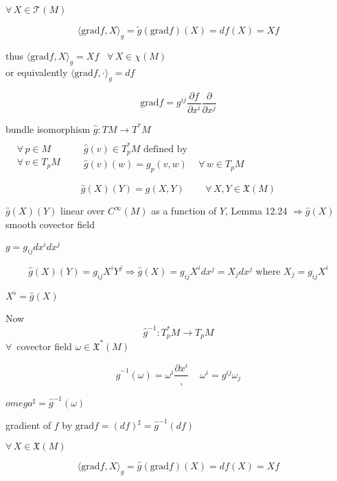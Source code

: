 $\forall \, X \in \mathcal{T}(M)$

\[
\langle \text{grad}{f}, X\rangle_g = \widetilde{g} (\text{grad}{f})(X) = df(X) = Xf
\]

thus $\langle \text{grad}{f}, X\rangle_g = Xf$ \quad \, $\forall \, X \in \mathcal{\chi}(M)$ \\
\phantom{thus } or equivalently $\langle \text{grad}{f}, \cdot \rangle_g = df$

\[
\text{grad}{f} = g^{ij} \frac{ \partial f}{ \partial x^i} \frac{ \partial }{ \partial x^j}
\]
\hrulefill


bundle isomorphism $\widehat{g} : TM \to T^*M$  \\

$\begin{aligned}
  & \quad \\ 
  & \forall \, p \in M \\
  & \forall \, v \in T_pM \end{aligned}$ \quad \quad \, $\begin{aligned} & \quad \\ 
  & \widehat{g}(v) \in T_p^*M \text{ defined by } \\
  & \widehat{g}(v)(w) = g_p(v,w) \quad \, \forall \, w \in T_p M \end{aligned}$

\[
\widehat{g}(X)(Y) = g(X,Y) \quad \quad \, \forall \, X,Y \in \mathfrak{X}(M)
\]


$\widehat{g}(X)(Y)$ linear over $C^{\infty}(M)$ as a function of $Y$, Lemma 12.24 $\Longrightarrow \widehat{g}(X)$ smooth covector field

$g=g_{ij}dx^i dx^j$ 

\[
\widehat{g}(X)(Y) = g_{ij}X^i Y^j \Longrightarrow \widehat{g}(X) = g_{ij}X^i dx^j = X_j dx^j \text{ where } X_j = g_{ij}X^i
\]

$X^{\flat} = \widehat{g}(X)$


Now
\[
\widehat{g}^{-1}:T_p^*M \to T_pM
\]
$\forall \, $ covector field $\omega \in \mathfrak{X}^*(M)$

\[
\widehat{g}^{-1}(\omega) = \omega^i \frac{ \partial x^i}, \quad \, \omega^i = g^{ij}\omega_j
\]

$omega^{\sharp} = \widehat{g}^{-1}(\omega)$


gradient of $f$ by $\text{grad}{f} = (df)^{\sharp} = \widehat{g}^{-1}(df)$

$\forall \, X \in \mathfrak{X}(M)$

\[
\langle \text{grad}f, X\rangle_g = \widehat{g}(\text{grad}f)(X) = df(X) =Xf
\]

